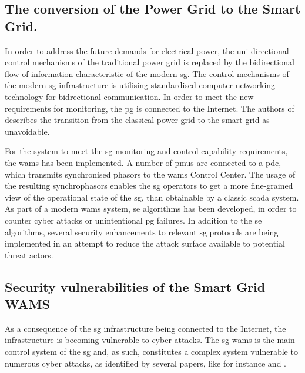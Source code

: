 \subsection{The conversion of the Power Grid to the Smart Grid.}




In order to address the future demands for electrical power, the uni-directional control mechanisms of the traditional power grid is replaced by the bidirectional flow of information characteristic of the modern \acrshort{sg}. The control mechanisms of the modern \acrshort{sg} infrastructure is utilising standardised computer networking technology for bidrectional communication.  In order to meet the new requirements for monitoring, the \acrshort{pg} is connected to the Internet. 
The authors of \cite{colak2020effects}  describes the transition from the classical power grid to the smart grid as unavoidable.

For the system to meet the \acrlong{sg} monitoring  and control capability requirements, the \acrfull{wams} has been implemented. 
A number of \acrlong{pmu}s are connected to a \acrlong{pdc}, which transmits synchronised phasors to the \acrshort{wams} Control Center. The usage of the resulting synchrophasors enables the \acrshort{sg} operators to get a more fine-grained view of the operational state of the \acrshort{sg}, than obtainable by a classic \acrshort{scada} system. As part of a modern \acrshort{wams} system, \acrfull{se} algorithms has been developed, in order to counter cyber attacks or unintentional \acrshort{pg} failures. In addition to the \acrshort{se} algorithms, several security enhancements to relevant \acrshort{sg} protocols are being implemented in an attempt to reduce the attack surface available to potential threat actors.







\subsection{Security vulnerabilities of the Smart Grid WAMS}
As a consequence of the \acrlong{sg} infrastructure being connected to the Internet, the infrastructure is becoming vulnerable to cyber attacks.   The \acrlong{sg} \acrlong{wams} is the main control system of the \acrshort{sg} and, as such, constitutes a complex system vulnerable to numerous cyber attacks, as identified by several papers,  like for instance \cite{li2019review} and  \cite{kateb2018enhancing}.

